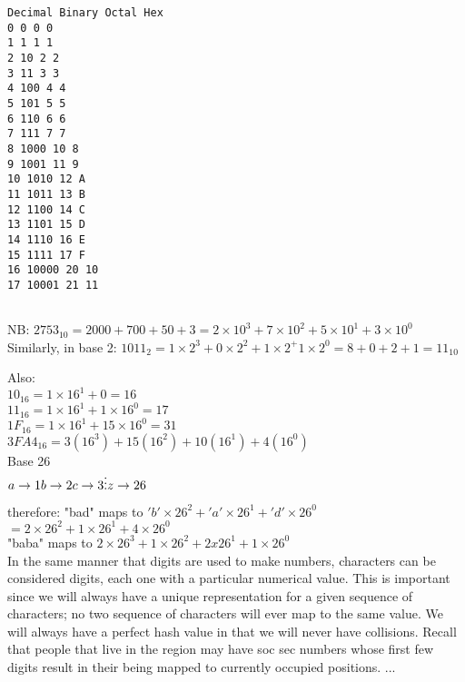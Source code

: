 \documentclass[11pt]{article} %
\begin{document}
\begin{verbatim}
Decimal Binary Octal Hex 
0 0 0 0 
1 1 1 1 
2 10 2 2 
3 11 3 3 
4 100 4 4 
5 101 5 5 
6 110 6 6 
7 111 7 7 
8 1000 10 8 
9 1001 11 9 
10 1010 12 A 
11 1011 13 B 
12 1100 14 C 
13 1101 15 D 
14 1110 16 E 
15 1111 17 F 
16 10000 20 10 
17 10001 21 11  


\end{verbatim}




NB:    $2753_{10}   =  2000 + 700 + 50 + 3  = 
2 \times 10^3 + 7 \times 10^2 + 5 \times 10^1 + 3 \times 10^0 $ \\


Similarly, in base 2:   $1011_2 = 1 \times 2^3  +  0 \times 2^2  + 1\times2^ +1\times2^0  = 8 + 0 + 2 + 1 = 11_{10}$

Also:
\\
$10_{16}  = 1 \times 16^1 + 0 = 16$ \\
$11_{16} = 1 \times 16^1 + 1\times16^0 = 17$ \\
$1F_{16} = 1 \times 16^1 + 15\times16^0 = 31$ \\
$3FA4_{16} = 3(16^3) + 15(16^2) + 10(16^1) + 4(16^0)$  \\

Base 26  \\
\begin{math}
a \rightarrow 1 \\
b \rightarrow 2 \\
c \rightarrow 3 \\
\vdots  \\
z \rightarrow 26 \\
\end{math}

therefore:   "bad"  maps to $'b' \times 26^2 + 'a' \times 26^1 + 'd' \times 26^0$  \\

                                  $ = 2 \times 26^2 + 1 \times 26^1 + 4 \times 26^0$  \\



"baba" maps to   $2 \times 26^3 + 1 \times 26^2 + 2 x 26^1 + 1 \times 26^0 $  \\





In the same manner that digits are used to make numbers, characters can be considered digits, each one with a particular numerical value.  This is important since we will always have a unique representation for a given sequence of characters; no two sequence of characters will ever map to the same value.  We will always have a perfect hash value in that we will never have collisions.  Recall that people that live in the region may have soc sec numbers whose first few digits result in their being mapped to currently occupied positions. ...
\end{document}
